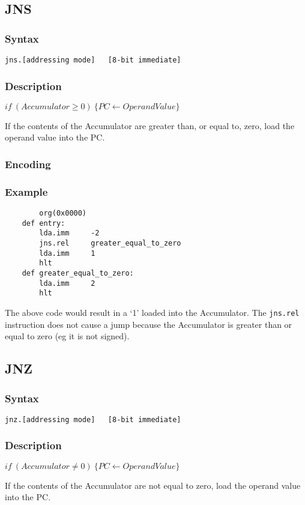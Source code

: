 \pagebreak
\subsection{JNS}\label{subsec:jns}
    \subsubsection{Syntax}
    \begin{verbatim}jns.[addressing mode]   [8-bit immediate]\end{verbatim}
    \subsubsection{Description}
    $if\ (Accumulator \geq 0)\ \{ PC \leftarrow OperandValue \}$
    \par If the contents of the Accumulator are greater than, or equal to, zero, load the operand value into the PC\@.
    \subsubsection{Encoding}
    \subsubsection{Example}
    \begin{verbatim}
        org(0x0000)
    def entry:
        lda.imm     -2
        jns.rel     greater_equal_to_zero
        lda.imm     1
        hlt
    def greater_equal_to_zero:
        lda.imm     2
        hlt
    \end{verbatim}
    \par The above code would result in a `1' loaded into the Accumulator.
    The \texttt{jns.rel} instruction does not cause a jump because the Accumulator
    is greater than or equal to zero (eg it is not signed).

\pagebreak
\subsection{JNZ}\label{subsec:jnz}
    \subsubsection{Syntax}
    \begin{verbatim}jnz.[addressing mode]   [8-bit immediate]\end{verbatim}
    \subsubsection{Description}
    $if\ (Accumulator \neq 0)\ \{ PC \leftarrow OperandValue \}$
    \par If the contents of the Accumulator are not equal to zero, load the operand value into the PC\@.

